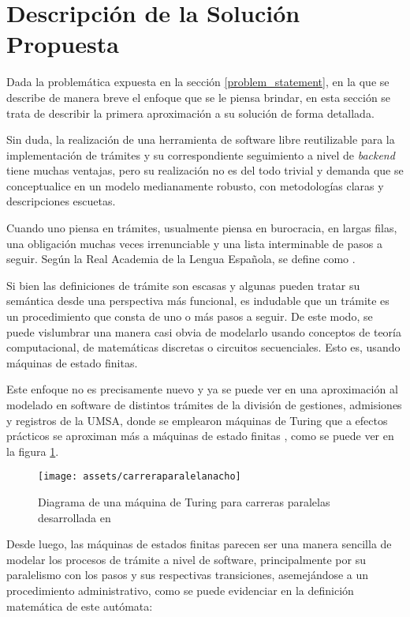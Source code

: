 \section{Descripción de la Solución Propuesta}
Dada la problemática expuesta en la sección \ref{problem_statement}, en la que
se describe de manera breve el enfoque que se le piensa brindar, en esta sección
se trata de describir la primera aproximación a su solución de forma detallada.

Sin duda, la realización de una herramienta de software libre reutilizable para
la implementación de trámites y su correspondiente seguimiento a nivel de
\textit{backend} tiene muchas ventajas, pero su realización no es del todo trivial y
demanda que se conceptualice en un modelo medianamente robusto, con metodologías
claras y descripciones escuetas.

Cuando uno piensa en trámites, usualmente piensa en burocracia, en largas filas,
una obligación muchas veces irrenunciable y una lista interminable de pasos a
seguir. Según la Real Academia de la Lengua Española, se define como  \parencite{asaleDiccionarioLenguaEspanola}.

Si bien las definiciones de trámite son escasas y algunas pueden tratar su
semántica desde una perspectiva más funcional, es indudable que un trámite es un
procedimiento que consta de uno o más pasos a seguir. De este modo, se puede
vislumbrar una manera casi obvia de modelarlo usando conceptos de teoría
computacional, de matemáticas discretas o circuitos secuenciales. Esto es,
usando máquinas de estado finitas.

Este enfoque no es precisamente nuevo y ya se puede ver en una aproximación al
modelado en software de distintos trámites de la división de gestiones,
admisiones y registros de la UMSA, donde se emplearon máquinas de Turing que a
efectos prácticos se aproximan más a máquinas de estado finitas
\parencite{nachoSISTEMACONTROLTRAMITES2007}, como se puede ver en la figura
\ref{fig:nachocarreraparalela}.

\begin{figure}
	\centering
	\texttt{[image: assets/carreraparalelanacho]}
	\caption{Diagrama de una máquina de Turing para carreras paralelas
		desarrollada en \cite{nachoSISTEMACONTROLTRAMITES2007}}
	\label{fig:nachocarreraparalela}
\end{figure}

Desde luego, las máquinas de estados finitas parecen ser una manera sencilla de
modelar los procesos de trámite a nivel de software, principalmente por su
paralelismo con los pasos y sus respectivas transiciones, asemejándose a un
procedimiento administrativo, como se puede evidenciar en la definición
matemática de este autómata:

